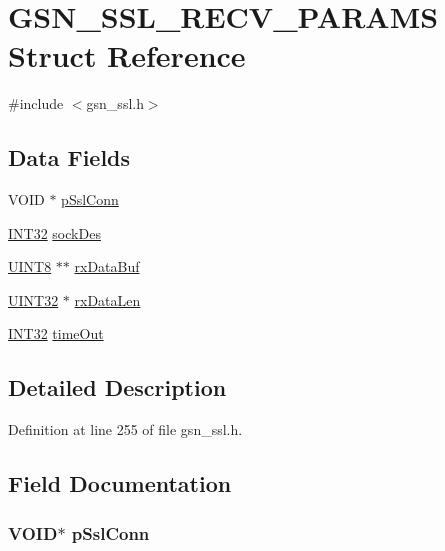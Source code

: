 \hypertarget{a00244}{
\section{GSN\_\-SSL\_\-RECV\_\-PARAMS Struct Reference}
\label{a00244}
}


{\ttfamily \#include $<$gsn\_\-ssl.h$>$}

\subsection*{Data Fields}
\begin{DoxyCompactItemize}
\item 
VOID $\ast$ \hyperlink{a00244_a3c7b1ab67e6b29e01bef4c3d88b0c292}{pSslConn}
\item 
\hyperlink{a00660_ga63021d67d54286c2163bcdb43a6f2569}{INT32} \hyperlink{a00244_a990471f388801cebd3a5b30dd1beb42e}{sockDes}
\item 
\hyperlink{a00660_gab27e9918b538ce9d8ca692479b375b6a}{UINT8} $\ast$$\ast$ \hyperlink{a00244_a6e604d1a5b870f696163260bfbcb39e3}{rxDataBuf}
\item 
\hyperlink{a00660_gae1e6edbbc26d6fbc71a90190d0266018}{UINT32} $\ast$ \hyperlink{a00244_a82a7992d64cbccb49d3c30db5b9350ab}{rxDataLen}
\item 
\hyperlink{a00660_ga63021d67d54286c2163bcdb43a6f2569}{INT32} \hyperlink{a00244_a87d41a70179b90987ab2eff426eae137}{timeOut}
\end{DoxyCompactItemize}


\subsection{Detailed Description}


Definition at line 255 of file gsn\_\-ssl.h.



\subsection{Field Documentation}
\hypertarget{a00244_a3c7b1ab67e6b29e01bef4c3d88b0c292}{
\subsubsection[{pSslConn}]{\setlength{\rightskip}{0pt plus 5cm}VOID$\ast$ {\bf pSslConn}}}
\label{a00244_a3c7b1ab67e6b29e01bef4c3d88b0c292}


